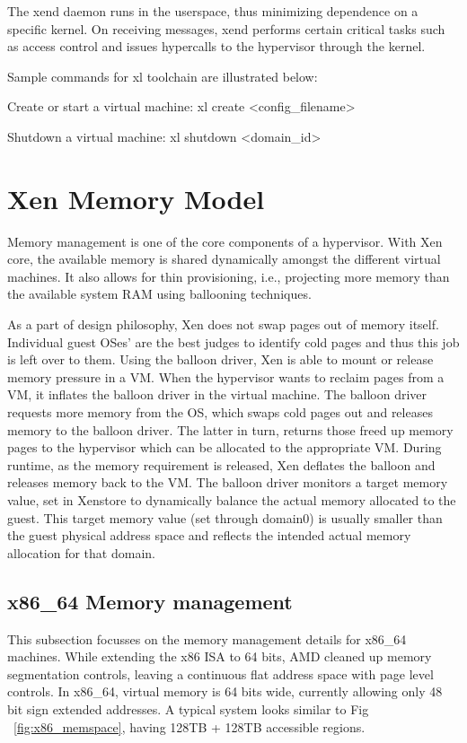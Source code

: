 The xend daemon runs in the userspace, thus minimizing dependence on a specific kernel. On receiving messages, xend performs certain critical tasks such as access control and issues hypercalls to the hypervisor through the kernel. 

 

Sample commands for xl toolchain are illustrated below: 

Create or start a virtual machine:  xl create <config\_filename> 

Shutdown a virtual machine:  xl shutdown <domain\_id> 


\section{Xen Memory Model}

Memory management is one of the core components of a hypervisor. With Xen core, the available memory is shared dynamically amongst the different virtual machines. It also allows for thin provisioning, i.e., projecting more memory than the available system RAM using ballooning techniques. 

 

As a part of design philosophy, Xen does not swap pages out of memory itself. Individual guest OSes’ are the best judges to identify cold pages and thus this job is left over to them. Using the balloon driver, Xen is able to mount or release memory pressure in a VM. When the hypervisor wants to reclaim pages from a VM, it inflates the balloon driver in the virtual machine. The balloon driver requests more memory from the OS, which swaps cold pages out and releases memory to the balloon driver. The latter in turn, returns those freed up memory pages to the hypervisor which can be allocated to the appropriate VM. During runtime, as the memory requirement is released, Xen deflates the balloon and releases memory back to the VM. The balloon driver monitors a target memory value, set in Xenstore to dynamically balance the actual memory allocated to the guest. This target memory value (set through domain0) is usually smaller than the guest physical address space and reflects the intended actual memory allocation for that domain. 

 

\subsection{x86\_64 Memory management}

This subsection focusses on the memory management details for x86\_64 machines. While extending the x86 ISA to 64 bits, AMD cleaned up memory segmentation controls, leaving a continuous flat address space with page level controls. In x86\_64, virtual memory is 64 bits wide, currently allowing only 48 bit sign extended addresses.  A typical system looks similar to Fig ~\ref{fig:x86_memspace}, having 128TB + 128TB accessible regions. 

